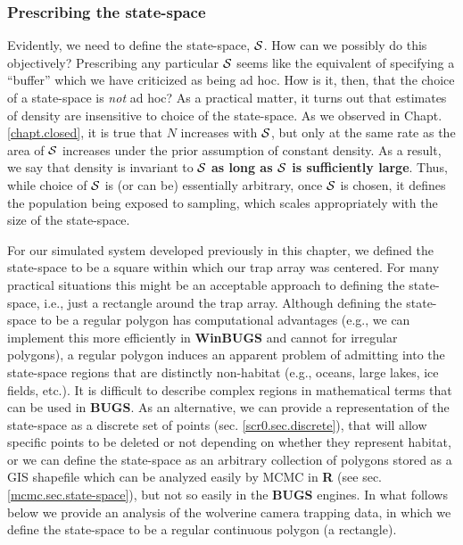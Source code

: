 \subsubsection{Prescribing the state-space}
\label{scr0.sec.ss}

Evidently, we need to define the state-space, ${\cal S}$. How can we
possibly do this objectively? Prescribing any particular ${\cal S}$
seems like the equivalent of specifying a ``buffer'' which we
have criticized as being ad hoc. How is it, then, that the
choice of a state-space is {\it not} ad hoc? As a practical matter, it
turns out that estimates of density are insensitive to choice of the
state-space. As we observed in Chapt. \ref{chapt.closed}, it is true
that $N$ increases with ${\cal S}$, but only at the same rate as the
area of ${\cal S}$ increases under the prior assumption of constant
density. As a result, we say that density is invariant to ${\cal S}$
{\bf as long as ${\cal S}$ is sufficiently large}. Thus, while choice of
${\cal S}$ is (or can be) essentially arbitrary, once ${\cal S}$ is
chosen, it defines the population being exposed to sampling, which
scales appropriately with the size of the state-space.

For our simulated system developed previously in this chapter, we
defined the state-space to be a square within which our trap array was
centered. For many practical situations this might be an
acceptable approach to defining the state-space, i.e., just a
rectangle around the trap array. 
 Although defining
the state-space to be a regular polygon has computational advantages
(e.g., we can implement this more efficiently in {\bf WinBUGS} and
cannot for irregular polygons), a regular polygon induces an apparent
problem of admitting into the state-space regions that are distinctly
non-habitat (e.g., oceans, large lakes, ice fields, etc.).  It is
difficult to describe complex regions in mathematical terms that can be
used in {\bf BUGS}. As an alternative, we can provide a
representation of the state-space as a discrete set of points (sec.
\ref{scr0.sec.discrete}), that will allow specific points to be deleted
or not depending on whether they represent habitat, or we can define
the state-space as an arbitrary  collection of polygons stored as a GIS
shapefile
which can be analyzed easily by MCMC in {\bf R}
(see sec. \ref{mcmc.sec.state-space}), but not so easily in the {\bf
  BUGS} engines.  In what follows below we provide an
analysis of the wolverine camera trapping data, in which we define
the state-space to be a regular
continuous polygon (a rectangle).


